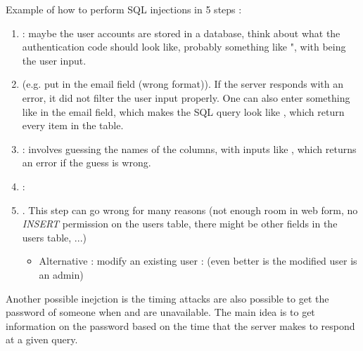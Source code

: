 Example of how to perform SQL injections in 5 steps :
\begin{enumerate}
    \item {} : maybe the user accounts are stored in a database, think about what the authentication code should look like, probably something like  ", with  being the user input.
    \item {} (e.g. put  in the email field (wrong format)). If the server responds with an error, it did not filter the user input properly. One can also enter something like  in the email field, which makes the SQL query look like , which return every item in the table.
    \item {} : involves guessing the names of the columns, with inputs like , which returns an error if the guess is wrong.
    \item {} : 
    \item {} . This step can go wrong for many reasons (not enough room in web form, no \textit{INSERT} permission on the users table, there might be other fields in the users table, ...)
        \begin{itemize}
            \item Alternative : modify an existing user :   (even better is the modified user is an admin)
        \end{itemize}
\end{enumerate}

Another possible inejction is the timing attacks are also possible to get the password of someone when  and  are unavailable. The main idea is to get information on the password based on the time that the server makes to respond at a given query.

